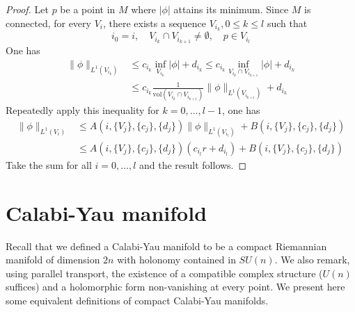 \documentclass[11pt]{article}
\begin{document}
\begin{proof}
Let \(p\) be a point in \(M\) where \(|\phi|\) attains its minimum. Since \(M\) is connected, for every \(V_i\), there exists a sequence \(V_{i_k}, 0\leq k\leq l\) such that
\[
i_0 = i,\quad V_{i_k}\cap V_{i_{k+1}}\ne \emptyset,\quad p\in V_{i_l}
\]
One has
\begin{align*}
\|\phi\|_{L^1(V_{i_k})} &\leq c_{i_k} \inf_{V_{i_k}} |\phi| + d_{i_k} \leq  c_{i_k} \inf_{V_{i_k}\cap V_{i_{k+1}}} |\phi| + d_{i_k}\\
 &\leq c_{i_k}\frac{1}{\text{vol}(V_{i_k}\cap V_{i_{k+1}})}\|\phi\|_{L^1(V_{i_{k+1}})} + d_{i_k}
\end{align*}
Repeatedly apply this inequality for \(k=0,\dots,l-1\), one has
\begin{align*}
\|\phi\|_{L^1(V_i)} &\leq A(i,\{V_j\},\{c_j\}, \{d_j\}) \|\phi\|_{L^1(V_{i_l})} + B(i,\{V_j\},\{c_j\}, \{d_j\})\\
&\leq A(i,\{V_j\},\{c_j\}, \{d_j\}) (c_{i_l} r+ d_{i_l}) + B(i,\{V_j\},\{c_j\}, \{d_j\})
\end{align*}
Take the sum for all \(i=0,\dots, l\) and the result follows.
\end{proof}








\section{Calabi-Yau manifold}
\label{sec:org58317ae}
Recall that we defined a Calabi-Yau manifold to be a compact Riemannian manifold of dimension \(2n\)
with holonomy contained in \(SU(n)\). We also remark, using parallel transport, the existence of a compatible
complex structure (\(U(n)\) suffices) and a holomorphic form non-vanishing at every point. We present
here some equivalent definitions of compact Calabi-Yau manifolds.
\end{document}
